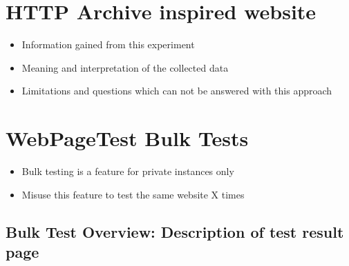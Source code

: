 \section{HTTP Archive inspired website}

\begin{itemize}
\item Information gained from this experiment
\item Meaning and interpretation of the collected data
\item Limitations and questions which can not be answered with this approach
\end{itemize}




\section{WebPageTest Bulk Tests}

\begin{itemize}
\item Bulk testing is a feature for private instances only
\item Misuse this feature to test the same website X times
\end{itemize}


\subsection{Bulk Test Overview: Description of test result page}

